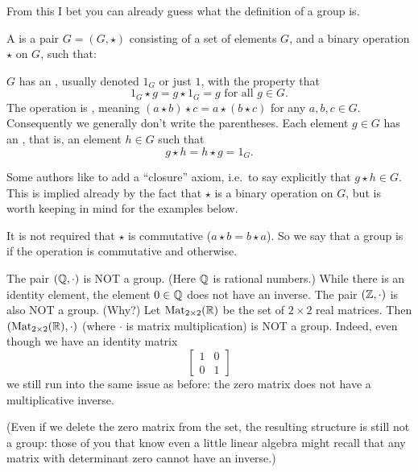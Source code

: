 From this I bet you can already guess what the definition of a group is.
\begin{definition}
	A  is a pair $G = (G, \star)$
	consisting of a set of elements $G$, and a binary operation $\star$ on $G$, such that:
	\begin{itemize}
		\ii $G$ has an , usually denoted $1_G$
		or just $1$, with the property that
		\[ 1_G \star g = g \star 1_G = g \text{ for all $g \in G$}. \]
		\ii The operation is , meaning
		$(a \star b) \star c = a \star (b \star c)$
		for any $a,b,c \in G$.
		Consequently we generally don't write the parentheses.
		\ii Each element $g \in G$ has an , that is, an element $h \in G$ such that \[ g \star h = h \star g = 1_G. \]
	\end{itemize}
	\label{def:group}
\end{definition}
\begin{remark}
	Some authors like to add a ``closure'' axiom,
	i.e.\ to say explicitly that $g \star h \in G$.
	This is implied already by the fact that $\star$
	is a binary operation on $G$,
	but is worth keeping in mind for the examples below.
\end{remark}

\begin{remark}
	It is not required that $\star$ is commutative ($a \star b = b \star a$).
	So we say that a group is  if the operation is
	commutative and  otherwise.
\end{remark}



\begin{example}
	\listhack
	\begin{itemize}
		\ii The pair $(\mathbb Q, \cdot)$ is NOT a group.
		(Here $\mathbb Q$ is rational numbers.)
		While there is an identity element, the element $0 \in \mathbb Q$
		does not have an inverse.
		\ii The pair $(\mathbb Z, \cdot)$ is also NOT a group. (Why?)
		\ii Let $\mathrm{Mat}_{2 \times 2}(\mathbb R)$ be the set of $2 \times 2$ real matrices.
		Then $(\mathrm{Mat}_{2 \times 2}(\mathbb R), \cdot)$
		(where $\cdot$ is matrix multiplication) is NOT a group.
		Indeed, even though we have an identity matrix
		\[ 
			\begin{bmatrix}
				1 & 0 \\ 0 & 1
			\end{bmatrix}
		\]
		we still run into the same issue as before:
		the zero matrix does not have a multiplicative inverse.

		(Even if we delete the zero matrix from the set,
		the resulting structure is still not a group:
		those of you that know even a little linear algebra
		might recall that any matrix with determinant zero
		cannot have an inverse.)
	\end{itemize}
\end{example}


